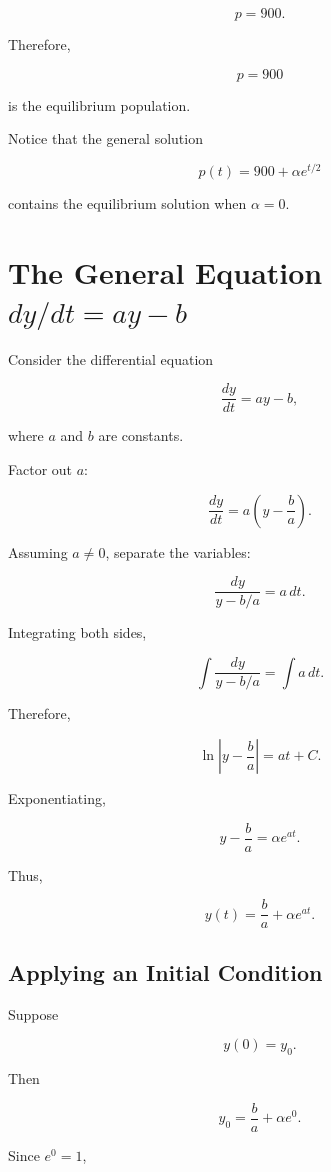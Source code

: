 \documentclass[11pt]{article}
\begin{document}
\[
p=900.
\]

Therefore,

\[
\boxed{p=900}
\]

is the equilibrium population.

Notice that the general solution

\[
p(t)=900+\alpha e^{t/2}
\]

contains the equilibrium solution when $\alpha=0$.

\section{The General Equation \texorpdfstring{$dy/dt=ay-b$}{dy/dt=ay-b}}

Consider the differential equation

\[
\frac{dy}{dt}=ay-b,
\]

where $a$ and $b$ are constants.

Factor out $a$:

\[
\frac{dy}{dt}
=
a\left(y-\frac{b}{a}\right).
\]

Assuming $a\neq0$, separate the variables:

\[
\frac{dy}{y-b/a}
=
a\,dt.
\]

Integrating both sides,

\[
\int \frac{dy}{y-b/a}
=
\int a\,dt.
\]

Therefore,

\[
\ln\left|y-\frac{b}{a}\right|
=
at+C.
\]

Exponentiating,

\[
y-\frac{b}{a}
=
\alpha e^{at}.
\]

Thus,

\[
\boxed{
y(t)
=
\frac{b}{a}
+
\alpha e^{at}
}.
\]

\subsection{Applying an Initial Condition}

Suppose

\[
y(0)=y_0.
\]

Then

\[
y_0
=
\frac{b}{a}
+
\alpha e^0.
\]

Since $e^0=1$,
\end{document}
